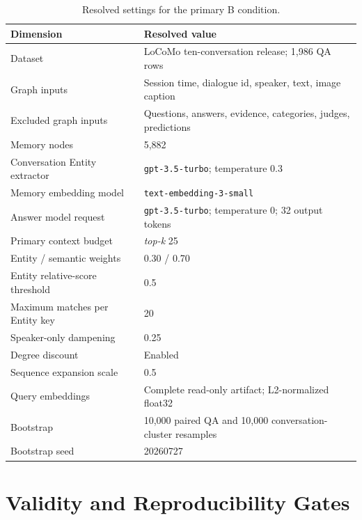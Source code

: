 \documentclass[10pt,twocolumn]{article}
\newcommand{\topk}{\textit{top-k}}
\begin{document}
\begin{table}[h]
\centering
\caption{Resolved settings for the primary B condition.}
\label{tab:config}
\begin{tabular}{@{}ll@{}}
\toprule
Dimension & Resolved value \\
\midrule
Dataset & LoCoMo ten-conversation release; 1,986 QA rows \\
Graph inputs & Session time, dialogue id, speaker, text, image caption \\
Excluded graph inputs & Questions, answers, evidence, categories, judges, predictions \\
Memory nodes & 5,882 \\
Conversation Entity extractor & \texttt{gpt-3.5-turbo}; temperature 0.3 \\
Memory embedding model & \texttt{text-embedding-3-small} \\
Answer model request & \texttt{gpt-3.5-turbo}; temperature 0; 32 output tokens \\
Primary context budget & \topk{} 25 \\
Entity / semantic weights & 0.30 / 0.70 \\
Entity relative-score threshold & 0.5 \\
Maximum matches per Entity key & 20 \\
Speaker-only dampening & 0.25 \\
Degree discount & Enabled \\
Sequence expansion scale & 0.5 \\
Query embeddings & Complete read-only artifact; L2-normalized float32 \\
Bootstrap & 10,000 paired QA and 10,000 conversation-cluster resamples \\
Bootstrap seed & 20260727 \\
\bottomrule
\end{tabular}
\end{table}

\section{Validity and Reproducibility Gates}
\end{document}
